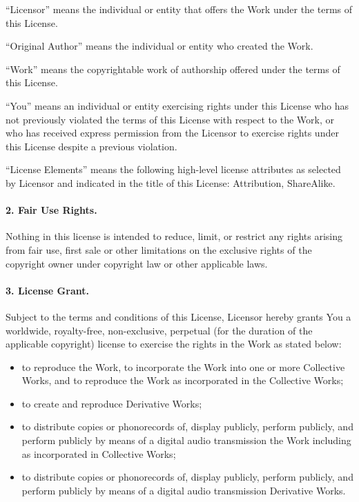 ``Licensor'' means the individual or entity that offers the Work under the terms of this License.

``Original Author'' means the individual or entity who created the Work.

``Work'' means the copyrightable work of authorship offered under the terms of this License.

``You'' means an individual or entity exercising rights under this License who has not previously violated the terms of this License with respect to the Work, or who has received express permission from the Licensor to exercise rights under this License despite a previous violation.

``License Elements'' means the following high-level license attributes as selected by Licensor and indicated in the title of this License: Attribution, ShareAlike.

\paragraph{2. Fair Use Rights.} Nothing in this license is intended to reduce, limit, or restrict any rights arising from fair use, first sale or other limitations on the exclusive rights of the copyright owner under copyright law or other applicable laws.

\paragraph{3. License Grant.} Subject to the terms and conditions of this License, Licensor hereby grants You a worldwide, royalty-free, non-exclusive, perpetual (for the duration of the applicable copyright) license to exercise the rights in the Work as stated below:
\begin{itemize}
\item[] to reproduce the Work, to incorporate the Work into one or more Collective Works, and to reproduce the Work as incorporated in the Collective Works;
\item[] to create and reproduce Derivative Works;
\item[] to distribute copies or phonorecords of, display publicly, perform publicly, and perform publicly by means of a digital audio transmission the Work including as incorporated in Collective Works;
\item[] to distribute copies or phonorecords of, display publicly, perform publicly, and perform publicly by means of a digital audio transmission Derivative Works.
\end{itemize}

